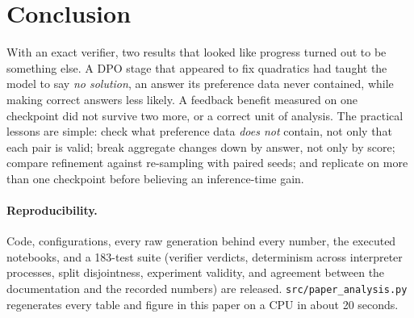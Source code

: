 \documentclass[10pt]{article}
\newcommand{\nosol}{\emph{no solution}}
\begin{document}
\section{Conclusion}
With an exact verifier, two results that looked like progress turned out to be
something else. A DPO stage that appeared to fix quadratics had taught the model to say
\nosol{}, an answer its preference data never contained, while making correct answers
less likely. A feedback benefit measured on one checkpoint did not survive two more, or
a correct unit of analysis. The practical lessons are simple: check what preference data
\emph{does not} contain, not only that each pair is valid; break aggregate changes down
by answer, not only by score; compare refinement against re-sampling with paired seeds;
and replicate on more than one checkpoint before believing an inference-time gain.

\paragraph{Reproducibility.} Code, configurations, every raw generation behind every
number, the executed notebooks, and a 183-test suite (verifier verdicts, determinism
across interpreter processes, split disjointness, experiment validity, and agreement
between the documentation and the recorded numbers) are released.
\texttt{src/paper\_analysis.py} regenerates every table and figure in this paper on a CPU
in about 20 seconds.



\end{document}
